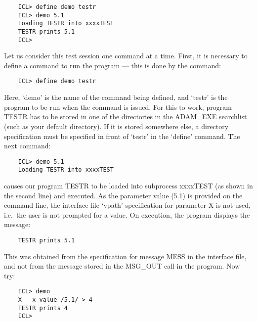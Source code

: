 \begin{small}
\begin{verbatim}
    ICL> define demo testr
    ICL> demo 5.1
    Loading TESTR into xxxxTEST
    TESTR prints 5.1
    ICL>
\end{verbatim}
\end{small}

Let us consider this test session one command at a time.
First, it is necessary to define a command to run the program --- this is done
by the command:

\begin{small}
\begin{verbatim}
    ICL> define demo testr
\end{verbatim}
\end{small}

Here, `demo' is the name of the command being defined, and `testr' is the
program to be run when the command is issued.
For this to work, program TESTR has to be stored in one of the directories in
the ADAM\_EXE searchlist (such as your default directory).
If it is stored somewhere else, a directory specification must be specified in
front of `testr' in the `define' command.
The next command:

\begin{small}
\begin{verbatim}
    ICL> demo 5.1
    Loading TESTR into xxxxTEST
\end{verbatim}
\end{small}

causes our program TESTR to be loaded into subprocess xxxxTEST (as shown in the
second line) and executed.
As the parameter value (5.1) is provided on the command line, the interface
file `vpath' specification for parameter X is not used, i.e.\ the user is not
prompted for a value.
On execution, the program displays the message:

\begin{small}
\begin{verbatim}
    TESTR prints 5.1
\end{verbatim}
\end{small}

This was obtained from the specification for message MESS in the interface
file, and not from the message stored in the MSG\_OUT call in the program.
Now try:

\begin{small}
\begin{verbatim}
    ICL> demo
    X - x value /5.1/ > 4
    TESTR prints 4
    ICL>
\end{verbatim}
\end{small}

